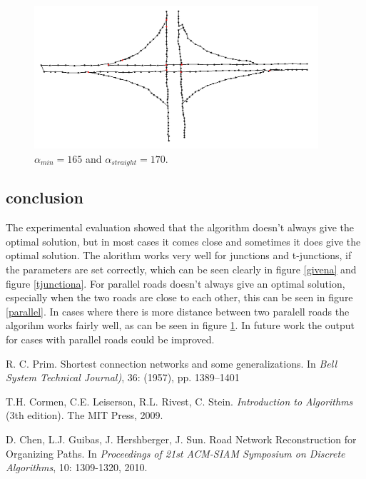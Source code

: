 \documentclass[11pt]{article}
\begin{document}
\begin{figure}[h]
  \centering
  \graphicspath{ {images/}}
  \includegraphics[width=\linewidth, height=150pt]{knooppunt167_170}
  \caption{$\alpha_{min}=165$ and $\alpha_{straight}=170$.}
  \label{knooppunt}
\end{figure}

\subsection{conclusion}
The experimental evaluation showed that the algorithm doesn't always give the optimal solution, but in most cases it comes close and sometimes it does give the optimal solution. The alorithm works very well for junctions and t-junctions, if the parameters are set correctly, which can be seen clearly in figure \ref{givena} and figure \ref{tjunctiona}. For parallel roads doesn't always give an optimal solution, especially when the two roads are close to each other, this can be seen in figure \ref{parallel}. In cases where there is more distance between two paralell roads the algorihm works fairly well, as can be seen in figure \ref{knooppunt}. In future work the output for cases with parallel roads could be improved.



\begin{thebibliography}{}

R. C. Prim.
Shortest connection networks and some generalizations.
In \emph{Bell System Technical Journal)}, 36: (1957), pp. 1389–1401

T.H. Cormen, C.E. Leiserson, R.L. Rivest, C. Stein.
\emph{Introduction to Algorithms} (3th edition).
The MIT Press, 2009.

D. Chen, L.J. Guibas, J. Hershberger, J. Sun.
Road Network Reconstruction for Organizing Paths.
In \emph{Proceedings  of  21st  ACM-SIAM  Symposium  on  Discrete  Algorithms}, 10: 1309-1320, 2010.
\end{thebibliography}
\end{document}
